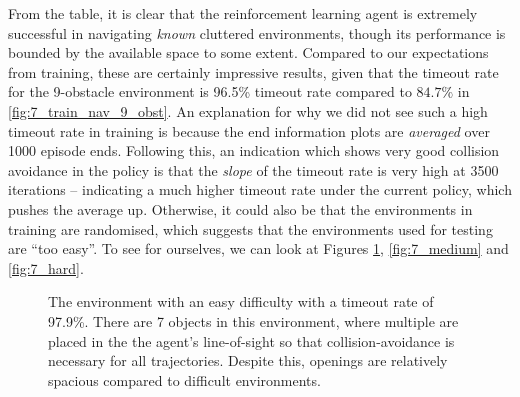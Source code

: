 From the table, it is clear that the reinforcement learning agent is extremely successful in navigating \textit{known} cluttered environments, though its performance is bounded by the available space to some extent. Compared to our expectations from training, these are certainly impressive results, given that the timeout rate for the 9-obstacle environment is 96.5\% timeout rate compared to $84.7\%$ in \cref{fig:7_train_nav_9_obst}. An explanation for why we did not see such a high timeout rate in training is because the end information plots are \textit{averaged} over 1000 episode ends. Following this, an indication which shows very good collision avoidance in the policy is that the \textit{slope} of the timeout rate is very high at 3500 iterations -- indicating a much higher timeout rate under the current policy, which pushes the average up. Otherwise, it could also be that the environments in training are randomised, which suggests that the environments used for testing are ``too easy''. To see for ourselves, we can look at Figures \ref{fig:7_easy}, \ref{fig:7_medium} and \ref{fig:7_hard}.
\begin{figure}[!htbp]
    \centering
    \caption{The environment with an easy difficulty with a timeout rate of 97.9\%. There are 7 objects in this environment, where multiple are placed in the the agent's line-of-sight so that collision-avoidance is necessary for all trajectories. Despite this, openings are relatively spacious compared to difficult environments.}
    \label{fig:7_easy}
\end{figure}
